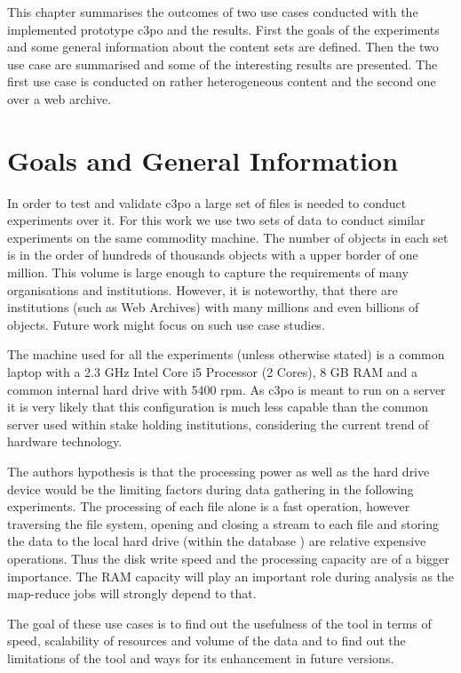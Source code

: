 This chapter summarises the outcomes of two use cases conducted with the implemented prototype c3po and
the results. First the goals of the experiments and some general information about the content sets are defined. Then the two use case are summarised and some of the interesting results are presented. The first use case is conducted on rather heterogeneous content and the second one over a web archive.

\section{Goals and General Information}
In order to test and validate c3po a large set of files is needed to conduct experiments over it.
For this work we use two sets of data to conduct similar experiments on the same commodity machine. The number of objects in each set is in the order of hundreds of thousands objects with a upper border of one million. This volume is large enough to capture the requirements of many organisations and institutions. However, it is noteworthy, that there are institutions (such as Web Archives) with many millions and even billions of objects. Future work might focus on such use case studies.

The machine used for all the experiments (unless otherwise stated) is a common laptop with a 2.3 GHz Intel Core i5 Processor (2 Cores), 8 GB RAM and a common internal hard drive with 5400 rpm. As c3po is meant to run on a server it is very likely that this configuration is much less capable than the common server used within stake holding institutions, considering the current trend of hardware technology.

The authors hypothesis is that the processing power as well as the hard drive device would be the limiting factors during data gathering in the following experiments. The  processing of each file alone is a fast operation, however traversing the file system, opening and closing a stream to each file and storing the data to the local hard drive (within the database ) are relative expensive operations. Thus the disk write speed and the processing capacity are of a bigger importance. The RAM capacity will play an important role during analysis as the map-reduce jobs will strongly depend to that.

The goal of these use cases is to find out the usefulness of the tool in terms of speed, scalability of resources and volume of the data and to find out the limitations of the tool and ways for its enhancement in future versions.

